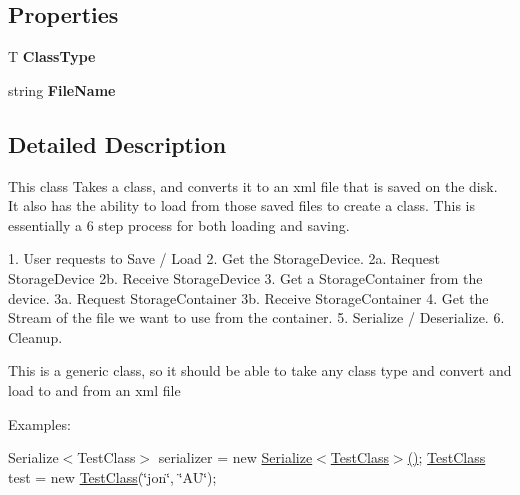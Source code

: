 \subsection*{Properties}
\begin{DoxyCompactItemize}
\item 
\hypertarget{class_custom_serialization_1_1_serialize_3_01_t_01_4_a66f70c7605f05b21815016f758632258}{T {\bfseries Class\-Type}}\label{d3/d5e/class_custom_serialization_1_1_serialize_3_01_t_01_4_a66f70c7605f05b21815016f758632258}

\item 
\hypertarget{class_custom_serialization_1_1_serialize_3_01_t_01_4_ac97ea1c257da237df262554ec94479cf}{string {\bfseries File\-Name}}\label{d3/d5e/class_custom_serialization_1_1_serialize_3_01_t_01_4_ac97ea1c257da237df262554ec94479cf}

\end{DoxyCompactItemize}


\subsection{Detailed Description}
This class Takes a class, and converts it to an xml file that is saved on the disk. It also has the ability to load from those saved files to create a class. This is essentially a 6 step process for both loading and saving. 

\begin{DoxyVerb}1. User requests to Save / Load
2. Get the StorageDevice.
    2a. Request StorageDevice
    2b. Receive StorageDevice
3. Get a StorageContainer from the device.
    3a. Request StorageContainer
    3b. Receive StorageContainer
4. Get the Stream of the file we want to use from the container.
5. Serialize / Deserialize.
6. Cleanup.
\end{DoxyVerb}


This is a generic class, so it should be able to take any class type and convert and load to and from an xml file

Examples\-:

Serialize$<$\-Test\-Class$>$ serializer = new \hyperlink{class_custom_serialization_1_1_serialize_3_01_t_01_4_a18418aaac4ebc3372de3410626a0ea55}{Serialize$<$\-Test\-Class$>$()}; \hyperlink{class_custom_serialization_1_1_test_class}{Test\-Class} test = new \hyperlink{class_custom_serialization_1_1_test_class}{Test\-Class}(\char`\"{}jon\char`\"{}, \char`\"{}\-A\-U\char`\"{});

